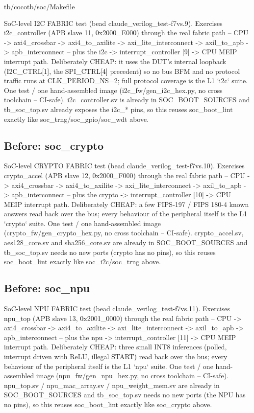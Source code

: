 \begin{relocated}{tb/cocotb/soc/Makefile}
\begin{textblock}
SoC-level I2C FABRIC test (bead claude_verilog_test-f7vs.9). Exercises i2c_controller (APB slave
11, 0x2000_E000) through the real fabric path -- CPU -> axi4_crossbar -> axi4_to_axilite ->
axi_lite_interconnect -> axil_to_apb -> apb_interconnect -- plus the i2c -> interrupt_controller
[9] -> CPU MEIP interrupt path. Deliberately CHEAP: it uses the DUT's internal loopback
(I2C_CTRL[1], the SPI_CTRL[4] precedent) so no bus BFM and no protocol traffic runs at
CLK_PERIOD_NS=2; full protocol coverage is the L1 `i2c` suite. One test / one hand-assembled
image (i2c_fw/gen_i2c_hex.py, no cross toolchain -- CI-safe). i2c_controller.sv is already in
SOC_BOOT_SOURCES and tb_soc_top.sv already exposes the i2c_* pins, so this reuses soc_boot_lint
exactly like soc_trng/soc_gpio/soc_wdt above.
\end{textblock}

\subsection*{Before: soc\_crypto}

\begin{textblock}
SoC-level CRYPTO FABRIC test (bead claude_verilog_test-f7vs.10). Exercises crypto_accel (APB slave
12, 0x2000_F000) through the real fabric path -- CPU -> axi4_crossbar -> axi4_to_axilite ->
axi_lite_interconnect -> axil_to_apb -> apb_interconnect -- plus the crypto -> interrupt_controller
[10] -> CPU MEIP interrupt path. Deliberately CHEAP: a few FIPS-197 / FIPS 180-4 known answers read
back over the bus; every behaviour of the peripheral itself is the L1 `crypto` suite. One test / one
hand-assembled image (crypto_fw/gen_crypto_hex.py, no cross toolchain -- CI-safe). crypto_accel.sv,
aes128_core.sv and sha256_core.sv are already in SOC_BOOT_SOURCES and tb_soc_top.sv needs no new
ports (crypto has no pins), so this reuses soc_boot_lint exactly like soc_i2c/soc_trng above.
\end{textblock}

\subsection*{Before: soc\_npu}

\begin{textblock}
SoC-level NPU FABRIC test (bead claude_verilog_test-f7vs.11). Exercises npu_top (APB slave 13,
0x2001_0000) through the real fabric path -- CPU -> axi4_crossbar -> axi4_to_axilite ->
axi_lite_interconnect -> axil_to_apb -> apb_interconnect -- plus the npu -> interrupt_controller
[11] -> CPU MEIP interrupt path. Deliberately CHEAP: three small INT8 inferences (polled, interrupt
driven with ReLU, illegal START) read back over the bus; every behaviour of the peripheral itself
is the L1 `npu` suite. One test / one hand-assembled image (npu_fw/gen_npu_hex.py, no cross
toolchain -- CI-safe). npu_top.sv / npu_mac_array.sv / npu_weight_mem.sv are already in
SOC_BOOT_SOURCES and tb_soc_top.sv needs no new ports (the NPU has no pins), so this reuses
soc_boot_lint exactly like soc_crypto above.
\end{textblock}


\end{relocated}

